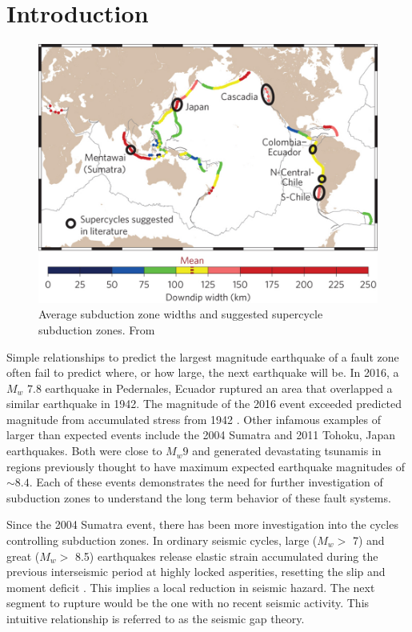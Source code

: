 \documentclass[]{proposalnsf}
\begin{document}
\section{Introduction}
\begin{figure}
	\includegraphics[width=1\linewidth]{Figures/Herrendorfer/ngeo2427-f1.jpeg}
	\caption{ Average subduction zone widths and suggested supercycle subduction zones. From \citet{Herrendorfer2015}}
	\label{fig:supercycles}
\end{figure}
Simple relationships to predict the largest magnitude earthquake of a fault zone often fail to predict where, or how large, the next earthquake will be. In 2016, a $M_w$ 7.8 earthquake in Pedernales, Ecuador ruptured an area that overlapped a similar earthquake in 1942. The magnitude of the 2016 event exceeded predicted magnitude from accumulated stress from 1942 \citep{Nocquet2016}. Other infamous examples of larger than expected events include the 2004 Sumatra and 2011 Tohoku, Japan earthquakes. Both were close to $M_w 9$ and generated devastating tsunamis in regions previously thought to have maximum expected earthquake magnitudes of $\sim 8.4$. Each of these events demonstrates the need for further investigation of subduction zones to understand the long term behavior of these fault systems. 

Since the 2004 Sumatra event, there has been more investigation into the cycles controlling subduction zones. In ordinary seismic cycles, large ($ M_w >$ 7) and great ($M_w >$ 8.5) earthquakes release elastic strain accumulated during the previous interseismic period at highly locked asperities, resetting the slip and moment deficit \citep{Nocquet2016}. This implies a local reduction in seismic hazard. The next segment to rupture would be the one with no recent seismic activity. This intuitive relationship is referred to as the seismic gap theory. 
\end{document}
